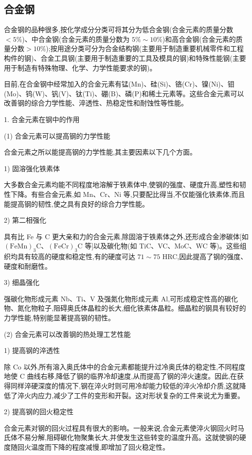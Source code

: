 \documentclass[UTF8]{ctexbook}
\newcommand{\◎}{\ensuremath{\bigcirc}}
\begin{document}
\subsection{合金钢}

合金钢的品种很多,按化学成分分类可将其分为低合金钢(合金元素的质量分数$<5\%$)、中合金钢(合金元素的质量分数为 $5\%\sim 10\%$)和高合金钢(合金元素的质量分数$>10\%$);按用途分类可分为合金结构钢(主要用于制造重要机械零件和工程构件的钢)、合金工具钢(主要用于制造重要的工具及模具的钢)和特殊性能钢(主要用于制造有特殊物理、化学、力学性能要求的钢)。

目前,在合金钢中经常加入的合金元素有锰(Mn)、硅(Si)、铬(Cr)、镍(Ni)、钼(Mo)、钨(W)、钒(V)、钛(Ti)、硼(B)、磷(P)和稀土元素等。这些合金元素可以改善钢的综合力学性能、淬透性、热稳定性和耐蚀性等性能。

1. 合金元素在钢中的作用

(1) 合金元素可以提高钢的力学性能

合金元素之所以能提高钢的力学性能,其主要因素以下几个方面。

1) 固溶强化铁素体

大多数合金元素均能不同程度地溶解于铁素体中,使钢的强度、硬度升高,塑性和韧性下降。有些合金元素,如 Mn、Cr、Ni 等,只要配比得当,不仅能强化铁素体,而且能提高钢的韧性,使之具有良好的综合力学性能。

2) 第二相强化

具有比 Fe 与 C 更大亲和力的合金元素,除固溶于铁素体之外,还形成合金渗碳体[如 $(\text{FeMn})_3\text{C}$、$(\text{FeCr})_3\text{C}$ 等]以及碳化物(如 TiC、VC、MoC、WC 等)。这些组织均具有较高的硬度和稳定性,有的硬度可达 $71\sim 75$ HRC,因此提高了钢的强度、硬度和耐磨性。

3) 细晶强化

强碳化物形成元素 Nb、Ti、V 及强氮化物形成元素 Al,可形成稳定性高的碳化物、氮化物粒子,阻碍奥氏体晶粒的长大,细化铁素体晶粒。细晶粒的钢具有较好的力学性能,特别能显著提高钢的韧性。

(2) 合金元素可以改善钢的热处理工艺性能

1) 提高钢的淬透性

除 Co 以外,所有溶入奥氏体中的合金元素都能提升过冷奥氏体的稳定性,不同程度地使 C 曲线右移,降低了钢的临界冷却速度,从而提高了钢的淬火速度。因此,在获得同样淬硬深度的情况下,钢在淬火时则可用冷却能力较低的淬火冷却介质,这就降低了淬火内应力,减少了工件的变形和开裂。这对形状复杂的工件来说尤为重要。

2) 提高钢的回火稳定性

合金元素对钢的回火过程具有很大的影响。一般来说,合金元素使淬火钢回火时马氏体不易分解,阻碍碳化物聚集长大,并使发生这些转变的温度升高。这就使钢的硬度随回火温度而下降的程度减慢,即增加了回火稳定性。
\end{document}
